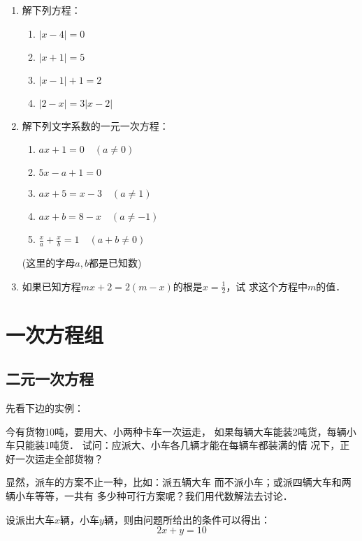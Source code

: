 \begin{enumerate}
\item 解下列方程：
\begin{multicols}{2}
\begin{enumerate}
    \item $|x-4|=0$
    \item $|x+1|=5$
    \item $|x-1|+1=2$
    \item $|2-x|=3|x-2|$
\end{enumerate}
\end{multicols}

\item 解下列文字系数的一元一次方程：
\begin{multicols}{2}
    \begin{enumerate}
        \item $ax+1=0\quad (a\ne 0)$
        \item $5x-a+1=0$
        \item $ax+5=x-3\quad (a\ne 1)$
        \item $ax+b=8-x\quad (a\ne -1)$
        \item $\frac{x}{a}+\frac{x}{b}=1\quad (a+b\ne 0)$
    \end{enumerate}
    (这里的字母$a,b$都是已知数)
    \end{multicols}

    \item 如果已知方程$mx+2=2(m-x)$的根是$x=\frac{1}{2}$，试
求这个方程中$m$的值．
\end{enumerate}


\section{一次方程组}
\subsection{二元一次方程}
    先看下边的实例：

    今有货物10吨，要用大、小两种卡车一次运走，
如果每辆大车能装2吨货，每辆小车只能装1吨货．
试问：应派大、小车各几辆才能在每辆车都装满的情
况下，正好一次运走全部货物？
    
显然，派车的方案不止一种，比如：派五辆大车
而不派小车；或派四辆大车和两辆小车等等，一共有
多少种可行方案呢？我们用代数解法去讨论．

设派出大车$x$辆，小车$y$辆，则由问题所给出的条件可以得出：
\begin{equation}
    2x+y=10
\end{equation}


